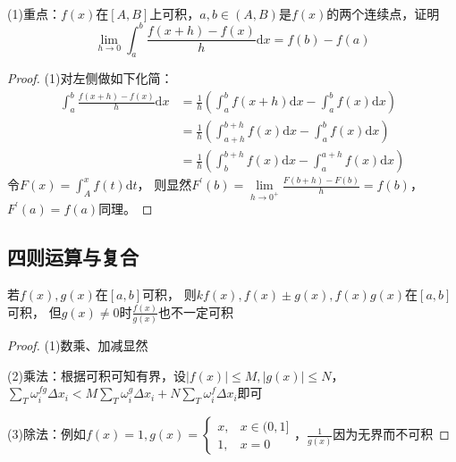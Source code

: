 ~

\begin{exercise}[使用微积分基本定理]
  (1)重点：$f(x)$在$[A,B]$上可积，$a,b \in (A,B)$是$f(x)$的两个连续点，证明
  \begin{equation*}
    \lim \limits _{h \rightarrow 0} \int_a^b \frac{f(x+h) - f(x)}{h} \mathrm{d} x = f(b) - f(a)
  \end{equation*}
\end{exercise}

\begin{proof}
  (1)对左侧做如下化简：
  \begin{align*}
    \int_a^b \frac{f(x+h) - f(x)}{h}\mathrm{d} x &= \frac{1}{h} \left( \int_a^b f(x+h)\mathrm{d} x - \int_a^b f(x)\mathrm{d}x \right)\\
    &= \frac{1}{h} \left( \int_{a+h}^{b+h} f(x)\mathrm{d} x - \int_a^b f(x)\mathrm{d} x \right)\\
    &= \frac{1}{h} \left( \int _b^{b+h} f(x)\mathrm{d} x - \int_a^{a+h} f(x)\mathrm{d} x \right)
  \end{align*}
  令$F(x) = \int _A^x f(t)\mathrm{d} t$，
  则显然$F^{\prime}(b) = \lim \limits _{h \rightarrow 0^+} \frac{F(b+h) - F(b)}{h} = f(b)$，
  $F^{\prime}(a) = f(a)$同理。
\end{proof}

\subsection{四则运算与复合}

\begin{theorem}[四则运算的可积性]
  若$f(x),g(x)$在$[a,b]$可积，
  则$kf(x), f(x) \pm g(x), f(x)g(x)$在$[a,b]$可积，
  但$g(x) \neq 0$时$\frac{f(x)}{g(x)}$也不一定可积
\end{theorem}

\begin{proof}
  (1)数乘、加减显然

  (2)乘法：根据可积可知有界，设$|f(x)| \leq M, |g(x)| \leq N$，
  $\sum\limits_T \omega_i^{fg} \Delta x_i < M\sum\limits_T \omega_i^g \Delta x_i + N \sum\limits_T \omega_i^f \Delta x_i$即可

  (3)除法：例如$f(x) = 1,g(x) =
  \begin{cases}
    x, & x \in (0,1]\\
    1, & x = 0
  \end{cases}
  $，$\frac{1}{g(x)}$因为无界而不可积
\end{proof}

~

